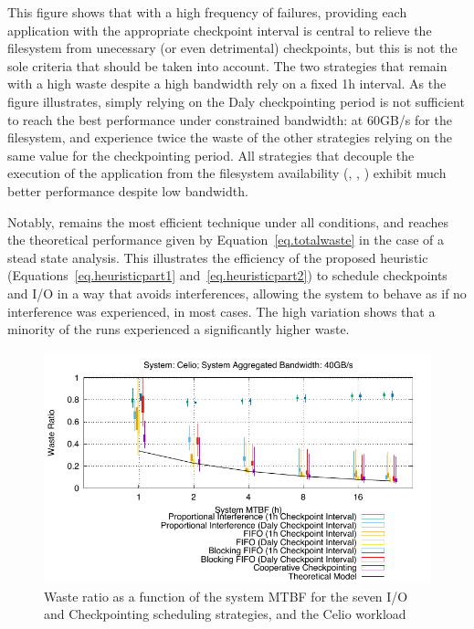 This figure shows that with a high frequency of failures, providing
each application with the appropriate checkpoint interval is central
to relieve the filesystem from unecessary (or even detrimental)
checkpoints, but this is not the sole criteria that should be taken
into account. The two strategies that remain with a high waste despite
a high bandwidth rely on a fixed 1h interval. As the figure
illustrates, simply relying on the Daly checkpointing period is not
sufficient to reach the best performance under constrained bandwidth:
at 60GB/s for the filesystem, \propdaly and \bfifodaly experience
twice the waste of the other strategies relying on the same value for
the checkpointing period. All strategies that decouple the execution
of the application from the filesystem availability (\fifodaly,
\fifofixed, \cooperative) exhibit much better performance despite low
bandwidth. 

Notably, \cooperative remains the most efficient technique under all
conditions, and reaches the theoretical performance given by
Equation~\ref{eq.totalwaste} in the case of a stead state
analysis. This illustrates the efficiency of the proposed heuristic
(Equations~\ref{eq.heuristicpart1} and~\ref{eq.heuristicpart2}) to
schedule checkpoints and I/O in a way that avoids interferences,
allowing the system to behave as if no interference was experienced,
in most cases. The high variation shows that a minority of the runs
experienced a significantly higher waste.

\begin{figure}
  \begin{center}
    \includegraphics[width=\linewidth]{sim/figures/synthetic-040gbs-waste-celio.pdf}
  \end{center}
  \caption{Waste ratio as a function of the system MTBF for the
    seven I/O and Checkpointing scheduling strategies, and the Celio
    workload \label{fig:celio-40gbs}}
\end{figure}

